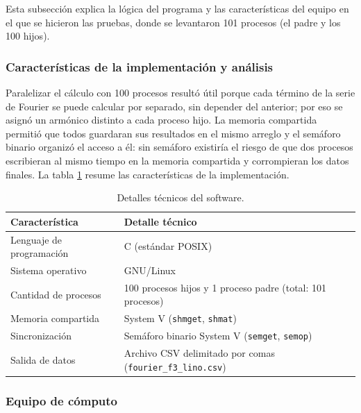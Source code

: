 Esta subsección explica la lógica del programa y las características del equipo en el que se hicieron las pruebas, donde se levantaron 101 procesos (el padre y los 100 hijos).

\subsubsection{Características de la implementación y análisis}
\label{sec:cap03:lino:tecnica}

Paralelizar el cálculo con 100 procesos resultó útil porque cada término de la serie de Fourier se puede calcular por separado, sin depender del anterior; por eso se asignó un armónico distinto a cada proceso hijo. La memoria compartida permitió que todos guardaran sus resultados en el mismo arreglo y el semáforo binario organizó el acceso a él: sin semáforo existiría el riesgo de que dos procesos escribieran al mismo tiempo en la memoria compartida y corrompieran los datos finales. La tabla \ref{tab:cap03:lino:caracteristicas} resume las características de la implementación.

\begin{table}[H]
    \centering
    \caption{Detalles técnicos del software.}
    \label{tab:cap03:lino:caracteristicas}
    \begin{tabular}{p{}p{}}
        \toprule
        \textbf{Característica} & \textbf{Detalle técnico} \\
        \midrule
        Lenguaje de programación & C (estándar POSIX) \\
        Sistema operativo & GNU/Linux \\
        Cantidad de procesos & 100 procesos hijos y 1 proceso padre (total: 101 procesos) \\
        Memoria compartida & System V (\texttt{shmget}, \texttt{shmat}) \\
        Sincronización & Semáforo binario System V (\texttt{semget}, \texttt{semop}) \\
        Salida de datos & Archivo CSV delimitado por comas (\texttt{fourier\_f3\_lino.csv}) \\
        \bottomrule
    \end{tabular}
\end{table}

\subsubsection{Equipo de cómputo}
\label{sec:cap03:lino:equipo}

